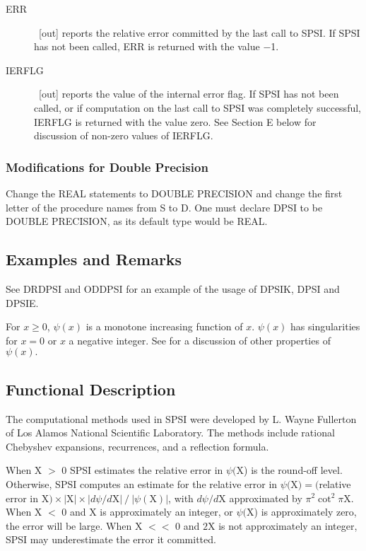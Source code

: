 \documentclass[twoside]{MATH77}
\begin{document}
\begin{description}
\item[ERR]  \ [out] reports the relative error committed by the last call to
SPSI. If SPSI has not been called, ERR is returned with the value $-$1.

\item[IERFLG]  \ [out] reports the value of the internal error flag. If SPSI
has not been called, or if computation on the last call to SPSI was
completely successful, IERFLG is returned with the value zero. See Section
E below for discussion of non-zero values of IERFLG.
\end{description}

\subsubsection{Modifications for Double Precision}

Change the REAL statements to DOUBLE PRECISION and change the first letter
of the procedure names from S to D. One must declare DPSI to be DOUBLE
PRECISION, as its default type would be REAL.

\subsection{Examples and Remarks}

See DRDPSI and ODDPSI for an example of the usage of DPSIK, DPSI and
DPSIE.

For $x \geq 0$, $\psi (x)$ is a monotone increasing function of $x$. $\psi
(x)$ has singularities for $x = 0$ or $x$ a negative integer. See
\cite{ams55} for a discussion of other properties of $\psi (x).$

\subsection{Functional Description}

The computational methods used in SPSI were developed by L. Wayne Fullerton
of Los Alamos National Scientific Laboratory. The methods include rational
Chebyshev expansions, recurrences, and a reflection formula.

When X $>$ 0 SPSI estimates the relative error in $\psi ($X) is the
round-off level.  Otherwise, SPSI computes an estimate for the
relative error in $\psi ($X$) = ($relative error in X$) \times |\text{X}|
\times |d\psi /d\text{X}|\ /\ |\psi (\text{X})|$, with $d\psi /d\text{X}$
approximated by $\pi ^2 \cot ^2 \pi \text{X}$.  When X $<$ 0 and X is
approximately an integer, or $\psi ($X) is approximately zero, the
error will be large.   When X $< < $ 0 and $2\text{X}$ is not approximately an
integer, SPSI may underestimate the error it committed.
\end{document}
